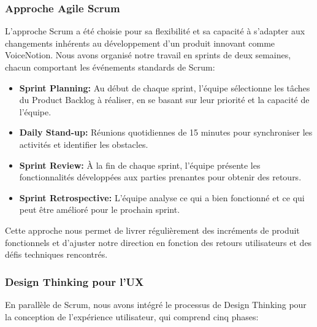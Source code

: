 \subsubsection{Approche Agile Scrum}

L'approche Scrum a été choisie pour sa flexibilité et sa capacité à s'adapter aux changements inhérents au développement d'un produit innovant comme VoiceNotion. Nous avons organisé notre travail en sprints de deux semaines, chacun comportant les événements standards de Scrum:

\begin{itemize}
    \item \textbf{Sprint Planning:} Au début de chaque sprint, l'équipe sélectionne les tâches du Product Backlog à réaliser, en se basant sur leur priorité et la capacité de l'équipe.
    
    \item \textbf{Daily Stand-up:} Réunions quotidiennes de 15 minutes pour synchroniser les activités et identifier les obstacles.
    
    \item \textbf{Sprint Review:} À la fin de chaque sprint, l'équipe présente les fonctionnalités développées aux parties prenantes pour obtenir des retours.
    
    \item \textbf{Sprint Retrospective:} L'équipe analyse ce qui a bien fonctionné et ce qui peut être amélioré pour le prochain sprint.
\end{itemize}

Cette approche nous permet de livrer régulièrement des incréments de produit fonctionnels et d'ajuster notre direction en fonction des retours utilisateurs et des défis techniques rencontrés.

\subsubsection{Design Thinking pour l'UX}

En parallèle de Scrum, nous avons intégré le processus de Design Thinking pour la conception de l'expérience utilisateur, qui comprend cinq phases:

